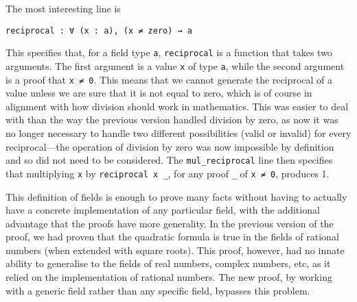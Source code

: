 \documentclass{article} %
\theoremstyle{plain}
\theoremstyle{definition}
\begin{document}
The most interesting line is 
\begin{lstlisting}
reciprocal : ∀ (x : a), (x ≠ zero) → a
\end{lstlisting}
This specifies that, for a field type \lstinline!a!, \lstinline!reciprocal! is a function that takes two arguments.
The first argument is a value \lstinline!x! of type \lstinline!a!, while the second argument is a proof that \lstinline!x ≠ 0!.
This means that we cannot generate the reciprocal of a value unless we are sure that it is not equal to zero,
which is of course in alignment with how division should work in mathematics.
This was easier to deal with than the way the previous version handled division by zero,
as now it was no longer necessary to handle two different possibilities (valid or invalid) for every reciprocal---the operation of division by zero was now impossible by definition and so did not need to be considered.
The \lstinline!mul_reciprocal! line then specifies that multiplying \lstinline!x! by \lstinline!reciprocal x _!, for any proof \lstinline!_! of \lstinline!x ≠ 0!, produces 1.

This definition of fields is enough to prove many facts without having to actually have a concrete implementation of any particular field,
with the additional advantage that the proofs have more generality.
In the previous version of the proof, we had proven that the quadratic formula is true in the fields of rational numbers (when extended with square roots).
This proof, however, had no innate ability to generalise to the fields of real numbers, complex numbers, etc,
as it relied on the implementation of rational numbers.
The new proof, by working with a generic field rather than any specific field, bypasses this problem.
\end{document}
